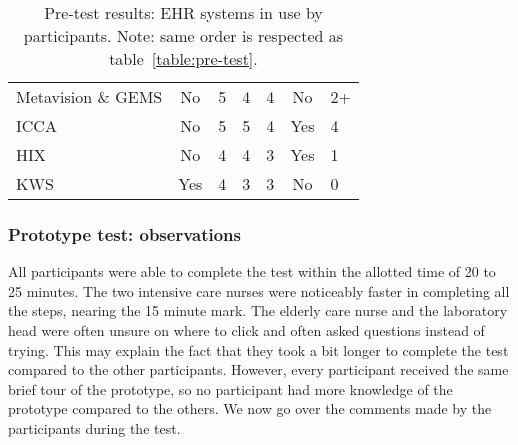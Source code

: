 \begin{table}[!t]
{\begin{tabular}{lcccccl}
        Metavision \& GEMS  & No              & 5                                                                     & 4                                                                          & 4                                                                         & No                                                                & 2+                                                                                       \\
        ICCA                & No              & 5                                                                     & 5                                                                          & 4                                                                         & Yes                                                               & 4                                                                                        \\
        HIX                 & No              & 4                                                                     & 4                                                                          & 3                                                                         & Yes                                                               & 1                                                                                        \\
        KWS                 & Yes             & 4                                                                     & 3                                                                          & 3                                                                         & No                                                                & 0
        \end{tabular}%
        }
        \caption{Pre-test results: EHR systems in use by participants. Note: same order is respected as table~\ref{table:pre-test}.}\label{table:pre-test-ehr}
    \end{table}

    \subsubsection{Prototype test: observations}

    All participants were able to complete the test within the allotted time of 20 to 25 minutes. The two intensive care nurses were noticeably faster in completing all the steps, nearing the 15 minute mark. The elderly care nurse and the laboratory head were often unsure on where to click and often asked questions instead of trying. This may explain the fact that they took a bit longer to complete the test compared to the other participants. However, every participant received the same brief tour of the prototype, so no participant had more knowledge of the prototype compared to the others. We now go over the comments made by the participants during the test.

